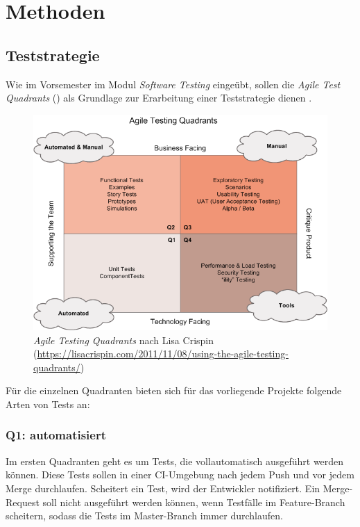 \section{Methoden}

\subsection{Teststrategie}

Wie im Vorsemester im Modul \textit{Software Testing} eingeübt, sollen die \textit{Agile Test Quadrants} () als Grundlage zur Erarbeitung einer Teststrategie dienen \cite[p. 242]{agiletest}.

\begin{figure}
	\centering
	\includegraphics[width=\linewidth]{pics/agile-testing-quadrants.png}
	\caption{\textit{Agile Testing Quadrants} nach Lisa Crispin (\url{https://lisacrispin.com/2011/11/08/using-the-agile-testing-quadrants/})}
	\label{fig:agile-testing-quadrants}
\end{figure}

Für die einzelnen Quadranten bieten sich für das vorliegende Projekte folgende Arten von Tests an:

\subsubsection{Q1: automatisiert}

Im ersten Quadranten geht es um Tests, die vollautomatisch ausgeführt werden können. Diese Tests sollen in einer CI-Umgebung nach jedem Push und vor jedem Merge durchlaufen. Scheitert ein Test, wird der Entwickler notifiziert. Ein Merge-Request soll nicht ausgeführt werden können, wenn Testfälle im Feature-Branch scheitern, sodass die Tests im Master-Branch immer durchlaufen.

